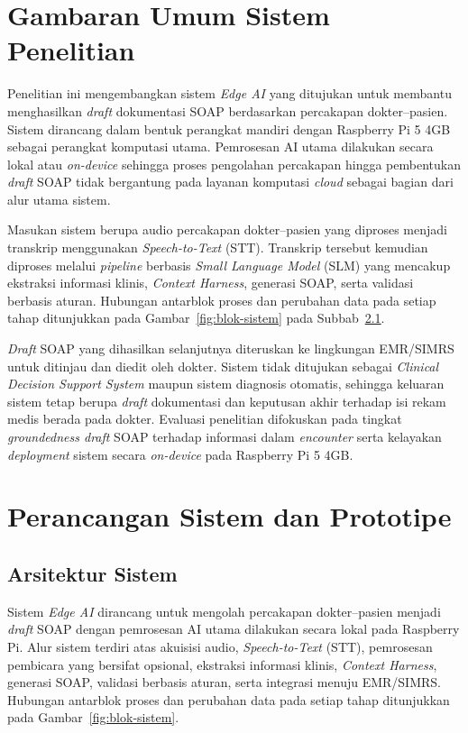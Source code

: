 \section{Gambaran Umum Sistem Penelitian}
\label{sec:gambaranumum}

Penelitian ini mengembangkan sistem \emph{Edge AI} yang ditujukan untuk membantu menghasilkan \emph{draft} dokumentasi SOAP berdasarkan percakapan dokter--pasien. Sistem dirancang dalam bentuk perangkat mandiri dengan Raspberry Pi 5 4GB sebagai perangkat komputasi utama. Pemrosesan AI utama dilakukan secara lokal atau \emph{on-device} sehingga proses pengolahan percakapan hingga pembentukan \emph{draft} SOAP tidak bergantung pada layanan komputasi \emph{cloud} sebagai bagian dari alur utama sistem.

Masukan sistem berupa audio percakapan dokter--pasien yang diproses menjadi transkrip menggunakan \emph{Speech-to-Text} (STT). Transkrip tersebut kemudian diproses melalui \emph{pipeline} berbasis \emph{Small Language Model} (SLM) yang mencakup ekstraksi informasi klinis, \emph{Context Harness}, generasi SOAP, serta validasi berbasis aturan. Hubungan antarblok proses dan perubahan data pada setiap tahap ditunjukkan pada Gambar~\ref{fig:blok-sistem} pada Subbab~\ref{subsec:arsitektursistem}.

\emph{Draft} SOAP yang dihasilkan selanjutnya diteruskan ke lingkungan EMR/SIMRS untuk ditinjau dan diedit oleh dokter. Sistem tidak ditujukan sebagai \emph{Clinical Decision Support System} maupun sistem diagnosis otomatis, sehingga keluaran sistem tetap berupa \emph{draft} dokumentasi dan keputusan akhir terhadap isi rekam medis berada pada dokter. Evaluasi penelitian difokuskan pada tingkat \emph{groundedness draft} SOAP terhadap informasi dalam \emph{encounter} serta kelayakan \emph{deployment} sistem secara \emph{on-device} pada Raspberry Pi 5 4GB.

\section{Perancangan Sistem dan Prototipe}
\label{sec:perancangansistem}

\subsection{Arsitektur Sistem}
\label{subsec:arsitektursistem}

Sistem \emph{Edge AI} dirancang untuk mengolah percakapan dokter--pasien menjadi \emph{draft} SOAP dengan pemrosesan AI utama dilakukan secara lokal pada Raspberry Pi. Alur sistem terdiri atas akuisisi audio, \emph{Speech-to-Text} (STT), pemrosesan pembicara yang bersifat opsional, ekstraksi informasi klinis, \emph{Context Harness}, generasi SOAP, validasi berbasis aturan, serta integrasi menuju EMR/SIMRS. Hubungan antarblok proses dan perubahan data pada setiap tahap ditunjukkan pada Gambar~\ref{fig:blok-sistem}.

